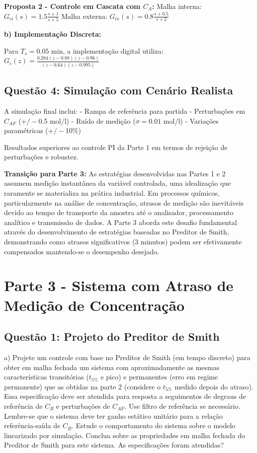 \documentclass[a4paper,12pt]{article}
\begin{document}
\textbf{Proposta 2 - Controle em Cascata com $C_A$:}
Malha interna: $G_{ci}(s) = 1.5 \frac{s + 1}{s + 5}$
Malha externa: $G_{ce}(s) = 0.8 \frac{s + 0.5}{s + 2}$

\textbf{b) Implementação Discreta:}

Para $T_s = 0.05$ min, a implementação digital utiliza:
$G_c(z) = \frac{0.284(z - 0.88)(z - 0.96)}{(z - 0.64)(z - 0.995)}$

\subsection{Questão 4: Simulação com Cenário Realista}

A simulação final inclui:
- Rampa de referência para partida
- Perturbações em $C_{AF}$ ($+/-$0.5 mol/l)
- Ruído de medição ($\sigma = 0.01$ mol/l)
- Variações paramétricas ($+/-$10\%)

Resultados superiores ao controle PI da Parte 1 em termos de rejeição de perturbações e robustez.

\textbf{Transição para Parte 3:} As estratégias desenvolvidas nas Partes 1 e 2 assumem medição instantânea da variável controlada, uma idealização que raramente se materializa na prática industrial. Em processos químicos, particularmente na análise de concentração, atrasos de medição são inevitáveis devido ao tempo de transporte da amostra até o analisador, processamento analítico e transmissão de dados. A Parte 3 aborda este desafio fundamental através do desenvolvimento de estratégias baseadas no Preditor de Smith, demonstrando como atrasos significativos (3 minutos) podem ser efetivamente compensados mantendo-se o desempenho desejado.

\newpage

\section{Parte 3 - Sistema com Atraso de Medição de Concentração}

\subsection{Questão 1: Projeto do Preditor de Smith}

a) Projete um controle com base no Preditor de Smith (em tempo discreto) para obter em malha fechada um sistema com aproximadamente as mesmas características transitórias ($t_{5\%}$ e pico) e permanentes (erro em regime permanente) que as obtidas na parte 2 (considere o $t_{5\%}$ medido depois do atraso). Essa especificação deve ser atendida para resposta a seguimentos de degraus de referência de $C_B$ e perturbações de $C_{AF}$. Use filtro de referência se necessário. Lembre-se que o sistema deve ter ganho estático unitário para a relação referência-saída de $C_B$. Estude o comportamento do sistema sobre o modelo linearizado por simulação. Conclua sobre as propriedades em malha fechada do Preditor de Smith para este sistema. As especificações foram atendidas?\\
\end{document}
